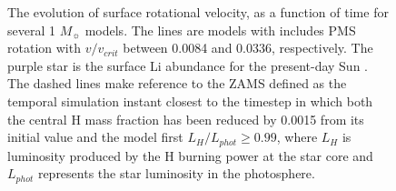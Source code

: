 \documentclass[fleqn,usenatbib]{mnras}
\begin{document}
\begin{figure}
\begin{subfigure}[h]{0.47\textwidth}
    \label{fig:subim26}
    \end{subfigure}
\caption{The evolution of surface rotational velocity, as a function of time for several 1 $M_{\sun}$ models. The lines are models with includes PMS rotation with $v/v_{crit}$ between 0.0084 and 0.0336, respectively. The purple star is the surface Li abundance for the present-day Sun \citep{Asplund2009}. The dashed lines make reference to the ZAMS defined as the temporal simulation instant closest to the timestep in which both the central H mass fraction has been reduced by 0.0015 from its initial value and the model first $L_H/L_{phot} \geq 0.99$, where $L_{H}$ is luminosity produced by the H burning power at the star core and $L_{phot}$ represents the star luminosity in the photosphere.}
\label{fig:image22}
\end{figure}
\end{document}
